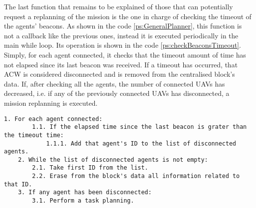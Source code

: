 The last function that remains to be explained of those that can potentially request a replanning of the mission is the one in charge of checking the timeout of the agents' beacons. As shown in the code \ref{ps:GeneralPlanner}, this function is not a callback like the previous ones, instead it is executed periodically in the main while loop. Its operation is shown in the code \ref{ps:checkBeaconsTimeout}. Simply, for each agent connected, it checks that the timeout amount of time has not elapsed since its last beacon was received. If a timeout has occurred, that \gls{ACW} is considered disconnected and is removed from the centralised block's data. If, after checking all the agents, the number of connected \glspl{UAV} has decreased, i.e. if any of the previously connected \glspl{UAV} has disconnected, a mission replanning is executed.

\begin{lstlisting}[caption={Beacons' timeout check function}, breaklines=true, label=ps:checkBeaconsTimeout]
	1. For each agent connected:
		1.1. If the elapsed time since the last beacon is grater than the timeout time:
			1.1.1. Add that agent's ID to the list of disconnected agents.
	2. While the list of disconnected agents is not empty:
		2.1. Take first ID from the list.
		2.2. Erase from the block's data all information related to that ID.
	3. If any agent has been disconnected:
		3.1. Perform a task planning.
\end{lstlisting}

